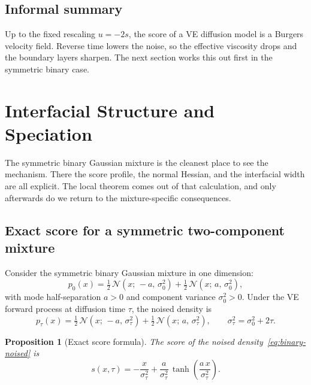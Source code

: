 \documentclass[11pt]{article}
\newtheorem{proposition}[theorem]{Proposition}
\begin{document}
\subsection{Informal summary}

Up to the fixed rescaling $u=-2s$, the score of a VE diffusion model is a Burgers velocity field. Reverse time lowers the noise, so the effective viscosity drops and the boundary layers sharpen. The next section works this out first in the symmetric binary case.


\section{Interfacial Structure and Speciation}\label{sec:shocks}

The symmetric binary Gaussian mixture is the cleanest place to see the mechanism. There the score profile, the normal Hessian, and the interfacial width are all explicit. The local theorem comes out of that calculation, and only afterwards do we return to the mixture-specific consequences.

\subsection{Exact score for a symmetric two-component mixture}\label{sec:shocks:exact}

Consider the symmetric binary Gaussian mixture in one dimension:
\begin{equation}\label{eq:binary-gmm}
  p_0(x) = \tfrac{1}{2}\,\mathcal{N}(x;\,-a,\,\sigma_0^2) + \tfrac{1}{2}\,\mathcal{N}(x;\,a,\,\sigma_0^2),
\end{equation}
with mode half-separation $a > 0$ and component variance $\sigma_0^2 > 0$.
Under the VE forward process at diffusion time $\tau$, the noised density is
\begin{equation}\label{eq:binary-noised}
  p_\tau(x) = \tfrac{1}{2}\,\mathcal{N}(x;\,-a,\,\sigma_\tau^2) + \tfrac{1}{2}\,\mathcal{N}(x;\,a,\,\sigma_\tau^2),
  \qquad \sigma_\tau^2 = \sigma_0^2 + 2\tau.
\end{equation}

\begin{proposition}[Exact score formula]\label{prop:exact-score}
The score of the noised density~\eqref{eq:binary-noised} is
\begin{equation}\label{eq:exact-score}
  s(x,\tau)
  = -\frac{x}{\sigma_\tau^2}
    + \frac{a}{\sigma_\tau^2}\,\tanh\!\left(\frac{a\,x}{\sigma_\tau^2}\right).
\end{equation}
\end{proposition}
\end{document}
